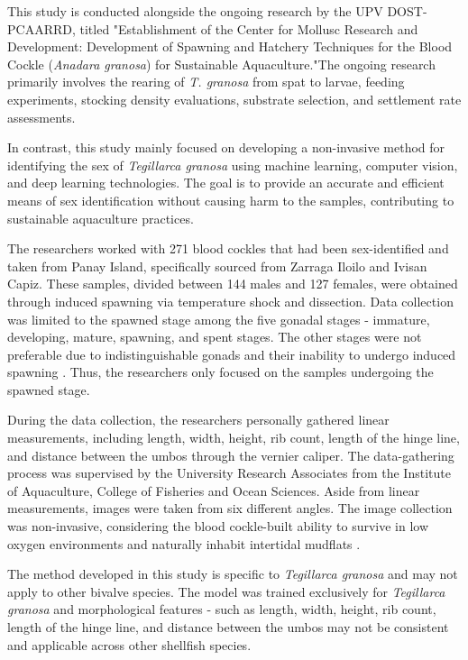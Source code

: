 This study is conducted alongside the ongoing research by the UPV DOST-PCAARRD, titled "Establishment of the Center for Mollusc Research and Development: Development of Spawning and Hatchery Techniques for the Blood Cockle (\textit{Anadara granosa}) for Sustainable Aquaculture."The ongoing research primarily involves the rearing of \textit{T. granosa} from spat to larvae, feeding experiments, stocking density evaluations, substrate selection, and settlement rate assessments.

In contrast, this study mainly focused on developing a non-invasive method for identifying the sex of \textit{Tegillarca granosa} using machine learning, computer vision, and deep learning technologies. The goal is to provide an accurate and efficient means of sex identification without causing harm to the samples, contributing to sustainable aquaculture practices.

The researchers worked with 271  blood cockles that had been sex-identified and taken from Panay Island, specifically sourced from Zarraga Iloilo and Ivisan Capiz. These samples, divided between 144 males and 127 females, were obtained through induced spawning via temperature shock and dissection. Data collection was limited to the spawned stage among the five gonadal stages  - immature, developing, mature, spawning, and spent stages. The other stages were not preferable due to indistinguishable gonads and their inability to undergo induced spawning \cite{may2021}.  Thus, the researchers only focused on the samples undergoing the spawned stage. 

During the data collection,  the researchers personally gathered linear measurements, including length, width, height, rib count, length of the hinge line, and distance between the umbos through the vernier caliper. The data-gathering process was supervised by the University Research Associates from the Institute of Aquaculture, College of Fisheries and Ocean Sciences. Aside from linear measurements, images were taken from six different angles. The image collection was non-invasive, considering the blood cockle-built ability to survive in low oxygen environments and naturally inhabit intertidal mudflats \cite{zhan2022}.

The method developed in this study is specific to \textit{Tegillarca granosa} and may not apply to other bivalve species. The model was trained exclusively for \textit{Tegillarca granosa} and morphological features - such as length, width, height, rib count, length of the hinge line, and distance between the umbos may not be consistent and applicable across other shellfish species. 

